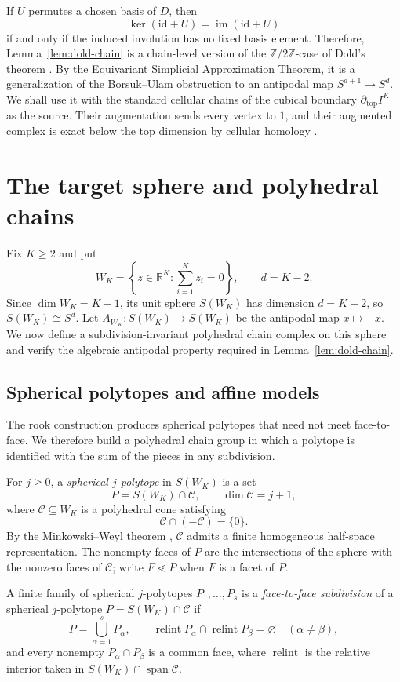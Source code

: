 \documentclass[reqno,12pt]{amsart}
\theoremstyle{definition}
\DeclareMathOperator{\relint}{relint}
\newcommand{\id}{\mathrm{id}}
\begin{document}
If $U$ permutes a chosen basis of $D$, then
\[
\ker(\id+U)=\operatorname{im}(\id+U)
\]
if and only if the induced involution has no fixed basis element. Therefore, Lemma~\ref{lem:dold-chain} is a chain-level version of the \(\mathbb Z/2\mathbb Z\)-case of Dold's theorem \cite{Dold}. By the Equivariant Simplicial Approximation Theorem, it is a generalization of the Borsuk--Ulam obstruction to an antipodal map \(S^{d+1}\to S^d\).  We shall use it with the standard cellular chains of the cubical boundary \(\partial_{\mathrm{top}}I^K\) as the source. Their augmentation sends every vertex to \(1\), and their augmented complex is exact below the top dimension by cellular homology \cite[Section~2.2]{Hatcher}.

\section{The target sphere and polyhedral chains}

Fix \(K\geq2\) and put
\[
 W_K=\left\{z\in\mathbb R^K:\sum_{i=1}^Kz_i=0\right\},
 \qquad d=K-2.
\]
Since \(\dim W_K=K-1\), its unit sphere \(S(W_K)\) has dimension
\(d=K-2\), so
\(S(W_K)\cong S^d\).  Let
\(A_{W_K}:S(W_K)\to S(W_K)\) be the antipodal map \(x\mapsto-x\).
We now define a subdivision-invariant polyhedral chain complex on this
sphere and verify the algebraic antipodal property required in
Lemma~\ref{lem:dold-chain}.

\subsection{Spherical polytopes and affine models}

The rook construction produces spherical polytopes that need not meet
face-to-face.  We therefore build a polyhedral chain group in which a
polytope is identified with the sum of the pieces in any subdivision.

For \(j\geq0\), a \emph{spherical \(j\)-polytope} in \(S(W_K)\) is a set
\[
 P=S(W_K)\cap\mathcal C,\qquad \dim\mathcal C=j+1,
\]
where \(\mathcal C\subseteq W_K\) is a polyhedral cone satisfying
\[
 \mathcal C\cap(-\mathcal C)=\{0\}.
\]
By the Minkowski--Weyl theorem \cite[Chapter~1]{Ziegler},
\(\mathcal C\) admits a finite homogeneous half-space representation.
The nonempty faces of \(P\) are the intersections of the sphere with
the nonzero faces of \(\mathcal C\); write \(F\lessdot P\) when \(F\) is a
facet of \(P\).

A finite family of spherical \(j\)-polytopes
\(P_1,\ldots,P_s\) is a
\emph{face-to-face subdivision} of a spherical \(j\)-polytope
\(P=S(W_K)\cap\mathcal C\) if
\[
 P=\bigcup_{\alpha=1}^sP_\alpha,\qquad
 \relint P_\alpha\cap\relint P_\beta=\varnothing
 \quad(\alpha\ne\beta),
\]
and every nonempty \(P_\alpha\cap P_\beta\) is a common face, where
\(\relint\) is the relative interior taken in
\(S(W_K)\cap\operatorname{span}\mathcal C\).
\end{document}
